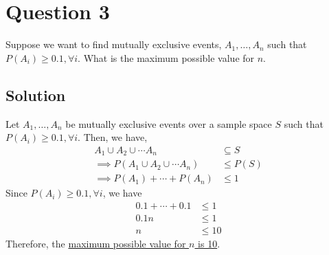 \section*{Question 3}

Suppose we want to find mutually exclusive events, \( A_1, \dots, A_n \) such that \( P(A_i) \geq 0.1, \forall i \).
What is the maximum possible value for \( n \).

\subsection*{Solution}

Let \( A_1, \dots, A_n \) be mutually exclusive events over a sample space \( S \) such that \( P(A_i) \geq 0.1, \forall i \).
Then, we have,
\begin{align*}
    A_1 \cup A_2 \cup \cdots A_n
     & \subseteq S
    \\
    \implies P(A_1 \cup A_2 \cup \cdots A_n)
     & \leq P(S)
    \\
    \implies P(A_1) + \cdots + P(A_n)
     & \leq 1
\end{align*}
Since \( P(A_i) \geq 0.1, \forall i \), we have
\begin{align*}
    0.1 + \cdots + 0.1 & \leq 1  \\
    0.1n               & \leq 1  \\
    n                  & \leq 10
\end{align*}
Therefore, the \underline{maximum possible value for \( n \) is 10}.
